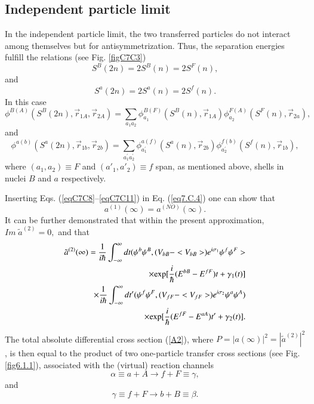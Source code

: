 \begin{subappendices}
\subsection{Independent particle limit}\label{C7S7C1}

In the independent particle limit, the two transferred particles do not interact among themselves but for antisymmetrization. 
Thus, the separation energies fulfill the relations (see Fig. \ref{figC7C3})
\begin{equation}\label{eqC7C8}
S^B(2n) = 2 S^B(n) = 2S^F(n),
\end{equation}
and 
\begin{equation}\label{eqC7C9}
S^a(2n) = 2 S^a(n) = 2 S^f(n).
\end{equation}
In this case 
\begin{equation}\label{eqC7C10}
\phi^{B(A)} (S^B(2n), \vec r_{1A},\vec r_{2A}) = \sum_{a_1 a_2} \phi_{a_1}^{B(F)} (S^B(n),\vec r_{1A}) 
\phi_{a_{2}}^{F(A)} (S^F(n),\vec r_{2a}),
\end{equation}
and 
\begin{equation}\label{eqC7C11}
\phi^{a(b)} (S^a(2n), \vec r_{1b},\vec r_{2b}) = 
\sum_{a^{'}_{1} a^{'}_{2}} \phi_{a^{'}_1}^{a(f)} (S^a(n),\vec r_{2b}) 
\phi_{a^{'}_{2}}^{f(b)} (S^f(n),\vec r_{1b}),
\end{equation}
where $(a_1, a_2) \equiv F$ and $(a'_1, a'_2) \equiv f$ span, as mentioned above, shells in nuclei $B$ and $a$ respectively. 

Inserting Eqs. (\ref{eqC7C8}--\ref{eqC7C11}) in Eq. (\ref{eq7.C.4}) one can show that 
\begin{equation}\label{eqC7C12}
a^{(1)} (\infty) = a^{(NO)}(\infty).
\end{equation}
It can be further demonstrated  that within the present approximation, $Im \; \tilde a^{(2)} =0,$ and that 
\begin{eqnarray}\label{eqC7C13}
\nonumber \tilde a^{(2)} (\infty) = \frac{1}{i \hbar} \int^{\infty}_{-\infty} dt (\psi^b \psi^B, (V_{bB} - <V_{bB}>) e^{i \sigma_1} \psi^f \psi^F >\\
\nonumber  \times 
{\rm exp} [\frac{i}{\hbar} (E^{bB} - E^{fF}) t + \gamma_1(t)] \nonumber  \\
\nonumber \times \frac{1}{i \hbar} \int^{\infty}_{-\infty} dt' (\psi^f \psi^F, (V_{fF} - <V_{fF}>) e^{i \sigma_2} \psi^a \psi^A ) \\
\times 
{\rm exp} [\frac{i}{\hbar} (E^{fF} - E^{aA}) t' + \gamma_2(t)].
\label{A12}
\end{eqnarray}
The total absolute differential cross section (\ref{A2}), where $P = |a(\infty)|^2 = |\tilde a^{(2)}|^2$, is then equal to the product of two one-particle transfer cross sections (see Fig. \ref{fig6.1.1}),  associated with the (virtual) reaction channels
\begin{equation}
\alpha \equiv a+A \to f +F \equiv \gamma,
\end{equation}
and 
\begin{equation}
\gamma \equiv f +F \to b+B \equiv \beta.
\end{equation}


\end{subappendices}
